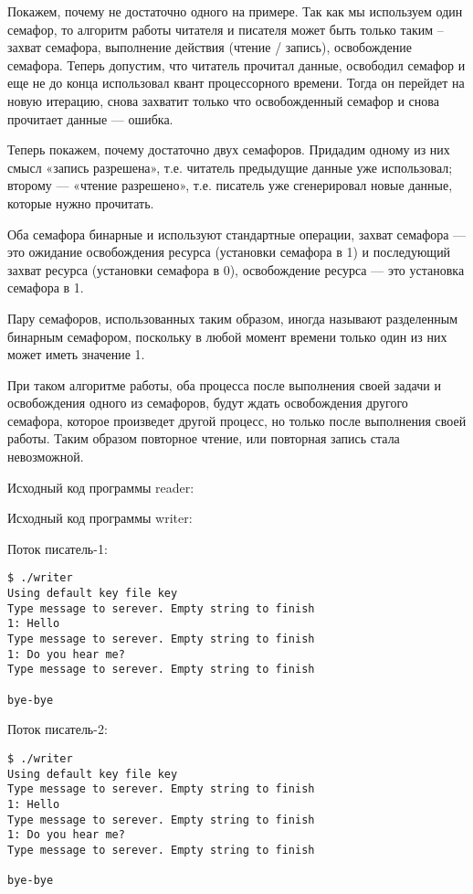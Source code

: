 \documentclass[a4paper]{article}
\begin{document}
	Покажем, почему не достаточно одного на примере. Так как мы используем один семафор, то алгоритм работы читателя и писателя может быть только таким – захват семафора, выполнение действия (чтение / запись), освобождение семафора. Теперь допустим, что читатель прочитал данные, освободил семафор и еще не до конца использовал квант процессорного времени. Тогда он перейдет на новую итерацию, снова захватит только что освобожденный семафор и снова прочитает данные --– ошибка.
	
	Теперь покажем, почему достаточно двух семафоров. Придадим одному из них смысл «запись разрешена», т.е. читатель предыдущие данные уже использовал; второму –-- «чтение разрешено», т.е. писатель уже сгенерировал новые данные, которые нужно прочитать.
	
	Оба семафора бинарные и используют стандартные операции, захват семафора --– это ожидание освобождения ресурса (установки семафора в 1) и последующий захват ресурса (установки семафора в 0), освобождение ресурса --– это установка семафора в 1.

	Пару семафоров, использованных таким образом, иногда называют разделенным бинарным семафором, поскольку в любой момент времени только один из них может иметь значение 1.
	
	При таком алгоритме работы, оба процесса после выполнения своей задачи и освобождения одного из семафоров, будут ждать освобождения другого семафора, которое произведет другой процесс, но только после выполнения своей работы. Таким образом повторное чтение, или повторная запись стала невозможной.
	
	Исходный код программы reader:
	
		
	Исходный код программы writer:
	
	
	Поток писатель-1:
	\begin{lstlisting}[style=crs_bash]
$ ./writer 
Using default key file key
Type message to serever. Empty string to finish
1: Hello 
Type message to serever. Empty string to finish
1: Do you hear me?
Type message to serever. Empty string to finish

bye-bye
	\end{lstlisting}
	
	Поток писатель-2:
	\begin{lstlisting}[style=crs_bash]
$ ./writer 
Using default key file key
Type message to serever. Empty string to finish
1: Hello 
Type message to serever. Empty string to finish
1: Do you hear me?
Type message to serever. Empty string to finish

bye-bye
	\end{lstlisting}
	
\end{document}

